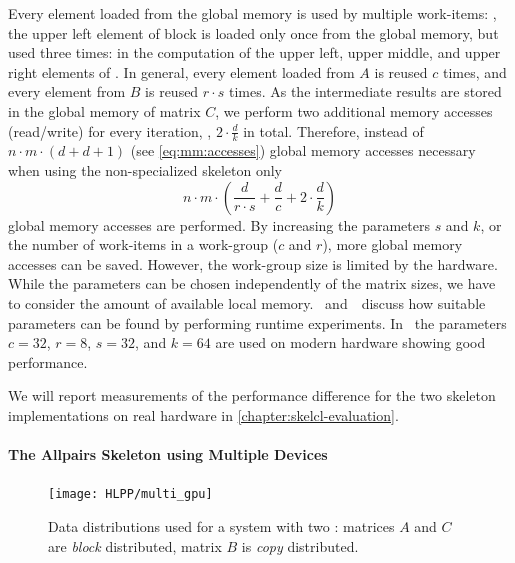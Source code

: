 Every element loaded from the global memory is used by multiple work-items:
\eg, the upper left element of block  is loaded only once from the global memory, but used three times:
in the computation of the upper left, upper middle, and upper right elements of .
In general, every element loaded from $A$ is reused $c$ times, and every element from $B$ is reused $r\cdot s$ times.
As the intermediate results are stored in the global memory of matrix $C$, we perform two additional memory accesses (read/write) for every iteration, \ie, $2\cdot \frac{d}{k}$ in total.
Therefore, instead of $n\cdot m\cdot (d + d + 1)$ (see \autoref{eq:mm:accesses}) global memory accesses necessary when using the non-specialized skeleton only
\begin{equation}
  n\cdot m\cdot (\frac{d}{r\cdot s} + \frac{d}{c} + 2\cdot \frac{d}{k})
\end{equation}
global memory accesses are performed.
By increasing the parameters $s$ and $k$, or the number of work-items in a work-group ($c$ and $r$), more global memory accesses can be saved.
However, the work-group size is limited by the \GPU hardware.
While the parameters can be chosen independently of the matrix sizes, we have to consider the amount of available local memory.
\cite{Friese2013}~and~\cite{SarjeAl2013}~discuss how suitable parameters can be found by performing runtime experiments.
In~\cite{Friese2013} the parameters $c = 32$, $r=8$, $s=32$, and $k=64$ are used on modern \GPU hardware showing good performance.

We will report measurements of the performance difference for the two skeleton implementations on real hardware in \autoref{chapter:skelcl-evaluation}.

\paragraph{The Allpairs Skeleton using Multiple Devices}
\label{sec:allpairs:multi_gpu}
\begin{figure}[b]
  \centering
  \texttt{[image: HLPP/multi\_gpu]}
  \caption[Data distributions used for the \allpairs skeleton for a system with two \GPUs.]%
          {Data distributions used for a system with two \GPUs: matrices $A$ and $C$ are \emph{block} distributed, matrix $B$ is \emph{copy} distributed.}
  \label{fig:multi_gpu}
\end{figure}

